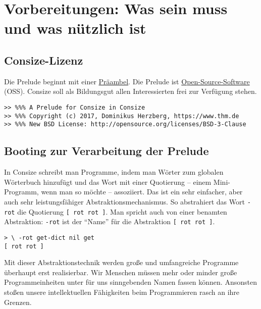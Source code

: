 \section{Vorbereitungen: Was sein muss und was nützlich ist}

\subsection{Consize-Lizenz}

Die Prelude beginnt mit einer \href{http://de.wikipedia.org/wiki/Pr%C3%A4ambel}{Präambel}.
Die Prelude ist \href{http://de.wikipedia.org/wiki/Open_source}{Open-Source-Software} (OSS). Consize soll als Bildungsgut allen Interessierten frei zur Verfügung stehen.

\begin{verbatim}
>> %%% A Prelude for Consize in Consize
>> %%% Copyright (c) 2017, Dominikus Herzberg, https://www.thm.de
>> %%% New BSD License: http://opensource.org/licenses/BSD-3-Clause
\end{verbatim}

\subsection{Booting zur Verarbeitung der Prelude}
\label{Sec:LoadBootimage}

In Consize schreibt man Programme, indem man Wörter zum globalen Wörterbuch hinzufügt und das Wort mit einer Quotierung -- einem Mini-Programm, wenn man so möchte -- assoziiert. Das ist ein sehr einfacher, aber auch sehr leistungsfähiger Abstraktionsmechanismus. So abstrahiert das Wort \verb|-rot| die Quotierung \verb|[ rot rot ]|. Man spricht auch von einer benamten Abstraktion: \verb|-rot| ist der "`Name"' für die Abstraktion \verb|[ rot rot ]|.

\begin{verbatim}
> \ -rot get-dict nil get
[ rot rot ]

\end{verbatim}

Mit dieser Abstraktionstechnik werden große und umfangreiche Programme überhaupt erst realisierbar. Wir Menschen müssen mehr oder minder große Programmeinheiten unter für uns sinngebenden Namen fassen können. Ansonsten stoßen unsere intellektuellen Fähigkeiten beim Programmieren rasch an ihre Grenzen.

